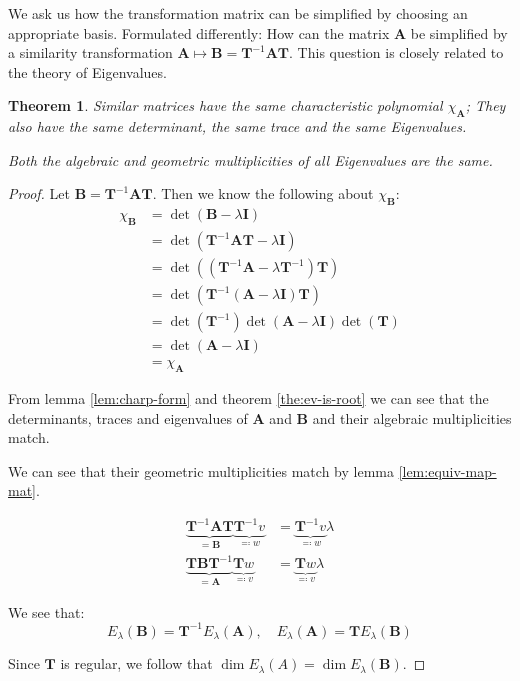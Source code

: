 \documentclass[a4paper,12pt]{article}
\newcommand{\I}{\mat{I}}
\newcommand{\A}{\mat{A}}
\newcommand{\B}{\mat{B}}
\newcommand{\T}{\mat{T}}
\newcommand{\Er}{E_{\lambda}}
\newcommand{\charp}[1]{\chi_{#1}}
\newcommand{\mat}[1]{\mathbf{#1}}
\newcommand{\inv}[1]{{#1}^{-1}}
\theoremstyle{plain}
\newtheorem{theorem}[lemma]{Theorem}
\numberwithin{equation}{section}
\begin{document}
We ask us how the transformation matrix can be simplified by choosing an appropriate basis.
Formulated differently: How can the matrix $\A$ be simplified by a similarity transformation
$\A \mapsto \B = \inv{\mat{T}} \A \mat{T}$. This question is closely related to
the theory of Eigenvalues.

\begin{theorem}
    Similar matrices have the same characteristic polynomial $\charp{\A}$; They
    also have the same determinant, the same trace and the same Eigenvalues.

    Both the algebraic and geometric multiplicities of all Eigenvalues are the same.
\end{theorem}

\begin{proof}
    Let $\B = \inv{\mat{T}} \A \mat{T}$. Then we know the following about $\charp{\B}$:
    \begin{align*}
        \charp{\B} &= \det(\B - \lambda \I) \\
        &= \det(\inv{\T} \A \T - \lambda \I) \\
        &= \det((\inv{\T} \A - \lambda \inv{\T}) \T) \\
        &= \det(\inv{\T} (\A - \lambda \I) \T) \\
        &= \det(\inv{\T}) \det(\A - \lambda \I) \det(\T) \\
        &= \det(\A - \lambda \I) \\
        &= \charp{\A}
    \end{align*}

    From lemma \ref{lem:charp-form} and theorem \ref{the:ev-is-root} we can see that
    the determinants, traces and eigenvalues of $\A$ and $\B$ and their algebraic multiplicities match.

    We can see that their geometric multiplicities match by lemma \ref{lem:equiv-map-mat}.

    \begin{align*}
        \underbrace{\inv{\T} \A \T}_{= \B} \underbrace{\inv{\T} v}_{\eqqcolon w} &= \underbrace{\inv{\T} v}_{\eqqcolon w} \lambda \\
        \underbrace{\T \B \inv{\T}}_{= \A} \underbrace{\T w}_{\eqqcolon v} &= \underbrace{\T w}_{\eqqcolon v} \lambda
    \end{align*}

    We see that:
    \begin{equation}
        \Er(\B) = \inv{\T} \Er(\A), \quad \Er(\A) = \T \Er(\B)
    \end{equation}

    Since $\T$ is regular, we follow that $\dim \Er(A) = \dim \Er(\B)$.
\end{proof}
\end{document}
